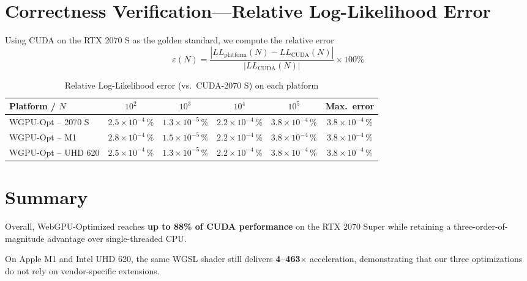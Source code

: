 \documentclass[PhD]{PHlab-thesis}
\begin{document}
\section{Correctness Verification—Relative Log-Likelihood Error}
Using CUDA on the RTX 2070 S as the golden standard, we compute the relative error
\[
\varepsilon(N) = \frac{|LL_{\text{platform}}(N) - LL_{\text{CUDA}}(N)|}{|LL_{\text{CUDA}}(N)|} \times 100\%
\]

\begin{table}[h]
  \centering
  \caption{Relative Log-Likelihood error (vs.\ CUDA-2070 S) on each platform}
  \label{tab:likelihood_error}

  \setlength{\tabcolsep}{6pt}          %
  \renewcommand{\arraystretch}{1.7}    %

  \small                                %
  \begin{tabularx}{\textwidth}{@{} X c c c c c @{}}
    \toprule
    Platform / $N$      & $10^2$           & $10^3$           & $10^4$           & $10^5$           & Max.\ error    \\
    \midrule
    WGPU-Opt -- 2070 S  & $2.5\times10^{-4}\,\%$ & $1.3\times10^{-5}\,\%$ & $2.2\times10^{-4}\,\%$ & $3.8\times10^{-4}\,\%$ & \textbf{$3.8\times10^{-4}\,\%$} \\
    WGPU-Opt -- M1      & $2.8\times10^{-4}\,\%$ & $1.5\times10^{-5}\,\%$ & $2.2\times10^{-4}\,\%$ & $3.8\times10^{-4}\,\%$ & $3.8\times10^{-4}\,\%$ \\
    WGPU-Opt -- UHD 620 & $2.5\times10^{-4}\,\%$ & $1.3\times10^{-5}\,\%$ & $2.2\times10^{-4}\,\%$ & $3.8\times10^{-4}\,\%$ & $3.8\times10^{-4}\,\%$ \\
    \bottomrule
  \end{tabularx}
\end{table}


\section{Summary}
Overall, WebGPU-Optimized reaches \textbf{up to 88\% of CUDA performance} on the RTX 2070 Super while retaining a three-order-of-magnitude advantage over single-threaded CPU.

On Apple M1 and Intel UHD 620, the same WGSL shader still delivers \textbf{4–463$\times$} acceleration, demonstrating that our three optimizations do not rely on vendor-specific extensions.
\end{document}
